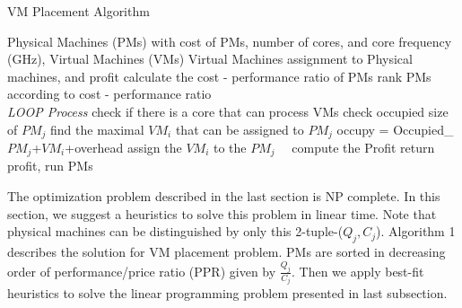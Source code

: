   \begin{algorithm}
 \caption{VM Placement Algorithm}
 \begin{algorithmic}[1]
 \renewcommand{\algorithmicrequire}{\textbf{Input:}}
 \renewcommand{\algorithmicensure}{\textbf{Output:}}
 \REQUIRE Physical Machines (PMs) with {cost of PMs, number of cores, and core frequency (GHz)}, Virtual Machines (VMs)
 \ENSURE  Virtual Machines assignment to Physical machines, and profit
 \STATE calculate the cost - performance ratio of PMs
 \STATE rank PMs according to cost - performance ratio
 \\ \textit{LOOP Process}
  \STATE check if there is a core that can process VMs
  \STATE check occupied size of $PM_j$
  \STATE find the maximal $VM_i$ that can be assigned to $PM_j$
  \STATE occupy = Occupied\_$PM_j$+$VM_i$+overhead
  \STATE assign the $VM_i$ to the $PM_j$
  \ENDIF
  \ENDFOR
  \ENDFOR
  \STATE　compute the Profit 
  \STATE return profit, run PMs
 \end{algorithmic} 
 \end{algorithm}
The optimization problem described in the last section is NP complete. In this section, we suggest a heuristics to solve this problem in linear time. Note that physical machines can be distinguished by only this 2-tuple-(${Q_j,C_j}$).  Algorithm 1 describes the solution for VM placement problem. PMs are sorted in decreasing order of performance/price ratio (PPR) given by $\frac{Q_j}{C_j}$. Then we apply best-fit heuristics to solve the linear programming problem presented in last subsection.

